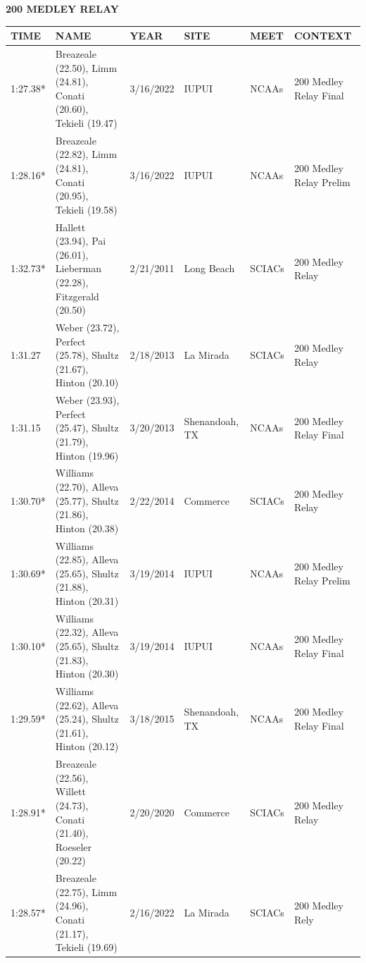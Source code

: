 \begin{table}[H]
\centering
\begin{minipage}[t]{0.6\textwidth}
\centering
\textbf{200 MEDLEY RELAY}\\[0.1cm]
\begin{tabular}{@{}p{1.8cm}p{2.8cm}p{1.2cm}p{1.4cm}p{1.4cm}p{2.0cm}@{}}
\hline
    \textbf{TIME} & \textbf{NAME} & \textbf{YEAR} & \textbf{SITE} & \textbf{MEET} & \textbf{CONTEXT} \\
\hline
    1:27.38* & Breazeale (22.50), Limm (24.81), Conati (20.60), Tekieli (19.47) & 3/16/2022 & IUPUI & NCAAs & 200 Medley Relay Final \\
    1:28.16* & Breazeale (22.82), Limm (24.81), Conati (20.95), Tekieli (19.58) & 3/16/2022 & IUPUI & NCAAs & 200 Medley Relay Prelim \\
    1:32.73* & Hallett (23.94), Pai (26.01), Lieberman (22.28), Fitzgerald (20.50) & 2/21/2011 & Long Beach & SCIACs & 200 Medley Relay \\
    1:31.27 & Weber (23.72), Perfect (25.78), Shultz (21.67), Hinton (20.10) & 2/18/2013 & La Mirada & SCIACs & 200 Medley Relay \\
    1:31.15 & Weber (23.93), Perfect (25.47), Shultz (21.79), Hinton (19.96) & 3/20/2013 & Shenandoah, TX & NCAAs & 200 Medley Relay Final \\
    1:30.70* & Williams (22.70), Alleva (25.77), Shultz (21.86), Hinton (20.38) & 2/22/2014 & Commerce & SCIACs & 200 Medley Relay \\
    1:30.69* & Williams (22.85), Alleva (25.65), Shultz (21.88), Hinton (20.31) & 3/19/2014 & IUPUI & NCAAs & 200 Medley Relay Prelim \\
    1:30.10* & Williams (22.32), Alleva (25.65), Shultz (21.83), Hinton (20.30) & 3/19/2014 & IUPUI & NCAAs & 200 Medley Relay Final \\
    1:29.59* & Williams (22.62), Alleva (25.24), Shultz (21.61), Hinton (20.12) & 3/18/2015 & Shenandoah, TX & NCAAs & 200 Medley Relay Final \\
    1:28.91* & Breazeale (22.56), Willett (24.73), Conati (21.40), Roeseler (20.22) & 2/20/2020 & Commerce & SCIACs & 200 Medley Relay \\
    1:28.57* & Breazeale (22.75), Limm (24.96), Conati (21.17), Tekieli (19.69) & 2/16/2022 & La Mirada & SCIACs & 200 Medley Rely \\
\hline
\end{tabular}
\end{minipage}
\end{table}

